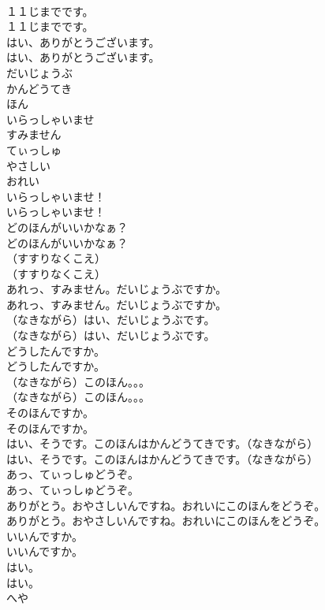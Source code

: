 \documentclass[8pt]{extreport}
\begin{document}
\begin{CJK}{UTF8}{min}
\\	１１じまでです。	
\\	１１じまでです。 
\\	はい、ありがとうございます。	
\\	はい、ありがとうございます。 
\\	だいじょうぶ
\\	かんどうてき
\\	ほん
\\	いらっしゃいませ
\\	すみません
\\	てぃっしゅ
\\	やさしい
\\	おれい
\\	いらっしゃいませ！	
\\	いらっしゃいませ！ 
\\	どのほんがいいかなぁ？	
\\	どのほんがいいかなぁ？ 
\\	（すすりなくこえ）	
\\	（すすりなくこえ） 
\\	あれっ、すみません。だいじょうぶですか。	
\\	あれっ、すみません。だいじょうぶですか。 
\\	（なきながら）はい、だいじょうぶです。	
\\	（なきながら）はい、だいじょうぶです。 
\\	どうしたんですか。	
\\	どうしたんですか。 
\\	（なきながら）このほん。。。	
\\	（なきながら）このほん。。。 
\\	そのほんですか。	
\\	そのほんですか。 
\\	はい、そうです。このほんはかんどうてきです。（なきながら）	
\\	はい、そうです。このほんはかんどうてきです。（なきながら） 
\\	あっ、てぃっしゅどうぞ。	
\\	あっ、てぃっしゅどうぞ。 
\\	ありがとう。おやさしいんですね。おれいにこのほんをどうぞ。	
\\	ありがとう。おやさしいんですね。おれいにこのほんをどうぞ。 
\\	いいんですか。	
\\	いいんですか。 
\\	はい。	
\\	はい。 
\\	へや

\end{CJK}
\end{document}
